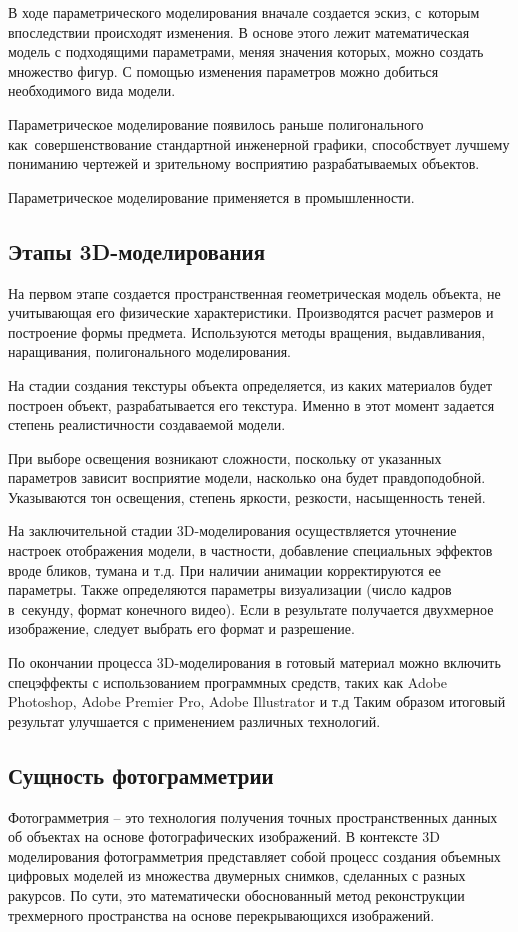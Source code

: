 \documentclass{ou}
\begin{document}
В ходе параметрического моделирования вначале создается эскиз, с~которым впоследствии происходят изменения. В основе этого лежит математическая модель с подходящими параметрами, меняя значения которых, можно создать множество фигур. С помощью изменения параметров можно добиться необходимого вида модели.

Параметрическое моделирование появилось раньше полигонального как~совершенствование стандартной инженерной графики, способствует лучшему пониманию чертежей и зрительному восприятию разрабатываемых объектов.

Параметрическое моделирование применяется в промышленности\cite{sushentsov_2023}.
\subsection{Этапы 3D-моделирования}
На первом этапе создается пространственная геометрическая модель объекта, не учитывающая его физические характеристики. Производятся расчет размеров и построение формы предмета. Используются методы вращения, выдавливания, наращивания, полигонального моделирования.

На стадии создания текстуры объекта определяется, из каких материалов будет построен объект, разрабатывается его текстура. Именно в этот момент задается степень реалистичности создаваемой модели.

При выборе освещения возникают сложности, поскольку от указанных параметров зависит восприятие модели, насколько она будет правдоподобной. Указываются тон освещения, степень яркости, резкости, насыщенность теней.

На заключительной стадии 3D-моделирования осуществляется уточнение настроек отображения модели, в частности, добавление специальных эффектов вроде бликов, тумана и т.д. При наличии анимации корректируются ее параметры. Также определяются параметры визуализации (число кадров в~секунду, формат конечного видео). Если в результате получается двухмерное изображение, следует выбрать его формат и разрешение.

По окончании процесса 3D-моделирования в готовый материал можно включить спецэффекты с использованием программных средств, таких как Adobe Photoshop, Adobe Premier Pro, Adobe Illustrator и т.д Таким образом итоговый результат улучшается с применением различных технологий\cite{sky_3d}.
\subsection{Сущность фотограмметрии}
Фотограмметрия -- это технология получения точных пространственных данных об объектах на основе фотографических изображений. В контексте 3D моделирования фотограмметрия представляет собой процесс создания объемных цифровых моделей из множества двумерных снимков, сделанных с разных ракурсов. По сути, это математически обоснованный метод реконструкции трехмерного пространства на основе перекрывающихся изображений. 
\end{document}
